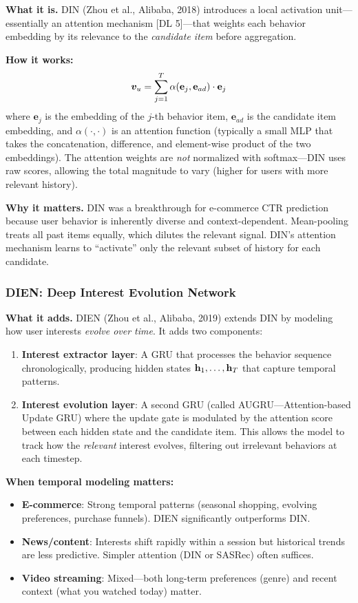 \textbf{What it is.} DIN (Zhou et al., Alibaba, 2018) introduces a local activation unit---essentially an attention mechanism [DL 5]---that weights each behavior embedding by its relevance to the \textit{candidate item} before aggregation.

\textbf{How it works:}
\begin{equation}
\bm{v}_u = \sum_{j=1}^{T} \alpha(\mathbf{e}_j, \mathbf{e}_{ad}) \cdot \mathbf{e}_j
\end{equation}
where $\mathbf{e}_j$ is the embedding of the $j$-th behavior item, $\mathbf{e}_{ad}$ is the candidate item embedding, and $\alpha(\cdot, \cdot)$ is an attention function (typically a small MLP that takes the concatenation, difference, and element-wise product of the two embeddings). The attention weights are \textit{not} normalized with softmax---DIN uses raw scores, allowing the total magnitude to vary (higher for users with more relevant history).

\textbf{Why it matters.} DIN was a breakthrough for e-commerce CTR prediction because user behavior is inherently diverse and context-dependent. Mean-pooling treats all past items equally, which dilutes the relevant signal. DIN's attention mechanism learns to ``activate'' only the relevant subset of history for each candidate.

\subsubsection{DIEN: Deep Interest Evolution Network}

\textbf{What it adds.} DIEN (Zhou et al., Alibaba, 2019) extends DIN by modeling how user interests \textit{evolve over time}. It adds two components:
\begin{enumerate}
    \item \textbf{Interest extractor layer}: A GRU that processes the behavior sequence chronologically, producing hidden states $\mathbf{h}_1, \ldots, \mathbf{h}_T$ that capture temporal patterns.
    \item \textbf{Interest evolution layer}: A second GRU (called AUGRU---Attention-based Update GRU) where the update gate is modulated by the attention score between each hidden state and the candidate item. This allows the model to track how the \textit{relevant} interest evolves, filtering out irrelevant behaviors at each timestep.
\end{enumerate}

\textbf{When temporal modeling matters:}
\begin{itemize}
    \item \textbf{E-commerce}: Strong temporal patterns (seasonal shopping, evolving preferences, purchase funnels). DIEN significantly outperforms DIN.
    \item \textbf{News/content}: Interests shift rapidly within a session but historical trends are less predictive. Simpler attention (DIN or SASRec) often suffices.
    \item \textbf{Video streaming}: Mixed---both long-term preferences (genre) and recent context (what you watched today) matter.
\end{itemize}


